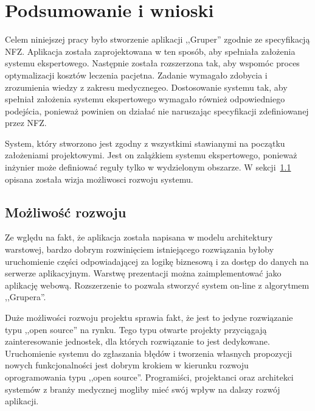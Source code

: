 \chapter{Podsumowanie i wnioski}
\label{cha:podsumowanie}

Celem niniejszej pracy było stworzenie aplikacji ,,Gruper'' zgodnie ze specyfikacją NFZ. Aplikacja została zaprojektowana w ten sposób, aby spełniała założenia systemu ekspertowego. Następnie została rozszerzona tak, aby wspomóc proces optymalizacji kosztów leczenia pacjetna. Zadanie wymagało zdobycia i zrozumienia wiedzy z zakresu medycznegeo. Dostosowanie systemu tak, aby spełniał założenia systemu ekspertowego wymagało również odpowiedniego podejścia, ponieważ powinien on działać nie naruszając specyfikacji zdefiniowanej przez NFZ.

System, który stworzono jest zgodny z wszystkimi stawianymi na początku założeniami projektowymi. Jest on zalążkiem systemu ekspertowego, ponieważ inżynier może definiować reguły tylko w wydzielonym obszarze. W sekcji~\ref{sec:mozliwoscRozwoju} opisana została wizja możliwosci rozwoju systemu.


\section{Możliwość rozwoju}
\label{sec:mozliwoscRozwoju}

Ze wględu na fakt, że aplikacja została napisana w modelu architektury warstowej, bardzo dobrym rozwinięciem istniejącego rozwiązania byłoby uruchomienie części odpowiadającej za logikę biznesową i za dostęp do danych na serwerze aplikacyjnym. Warstwę prezentacji można zaimplementować jako aplikację webową. Rozszerzenie to pozwala stworzyć system on-line z algorytmem ,,Grupera''.

Duże możliwości rozwoju projektu sprawia fakt, że jest to jedyne rozwiązanie typu ,,open source'' na rynku. Tego typu otwarte projekty przyciągają zainteresowanie jednostek, dla których rozwiązanie to jest dedykowane. Uruchomienie systemu do zgłaszania błędów i tworzenia własnych propozycji nowych funkcjonalności jest dobrym krokiem w kierunku rozwoju oprogramowania typu ,,open source''. Programiści, projektanci oraz architekci systemów z branży medycznej mogliby mieć swój wpływ na dalszy rozwój aplikacji.

